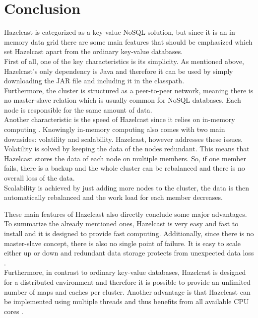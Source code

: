 \section{Conclusion}
Hazelcast is categorized as a key-value NoSQL solution, but since it is an in-memory data grid there are some main features that should be emphasized which set Hazelcast apart from the ordinary key-value databases.\\
First of all, one of the key characteristics is its simplicity. As mentioned above, Hazelcast’s only dependency is Java and therefore it can be used by simply downloading the JAR file and including it in the classpath. \\
Furthermore, the cluster is structured as a peer-to-peer network, meaning there is no master-slave relation which is usually common for NoSQL databases. Each node is responsible for the same amount of data. \\
Another characteristic is the speed of Hazelcast since it relies on in-memory computing \cite{hazelcastmanual}. Knowingly in-memory computing also comes with two main downsides: volatility and scalability. Hazelcast, however addresses these issues. \\
Volatility is solved by keeping the data of the nodes redundant. This means that Hazelcast stores the data of each node on multiple members. So, if one member fails, there is a backup and the whole cluster can be rebalanced and there is no overall loss of the data. \\
Scalability is achieved by just adding more nodes to the cluster, the data is then automatically rebalanced and the work load for each member decreases.

These main features of Hazelcast also directly conclude some major advantages. To summarize the already mentioned ones, Hazelcast is very easy and fast to install and it is designed to provide fast computing. Additionally, since there is no master-slave concept, there is also no single point of failure. It is easy to scale either up or down and redundant data storage protects from unexpected data loss \cite{hazelcastnosql}.\\
Furthermore, in contrast to ordinary key-value databases, Hazelcast is designed for a distributed environment and therefore it is possible to provide an unlimited number of maps and caches per cluster. Another advantage is that Hazelcast can be implemented using multiple threads and thus benefits from all available CPU cores \cite{hazelcastredis}.

